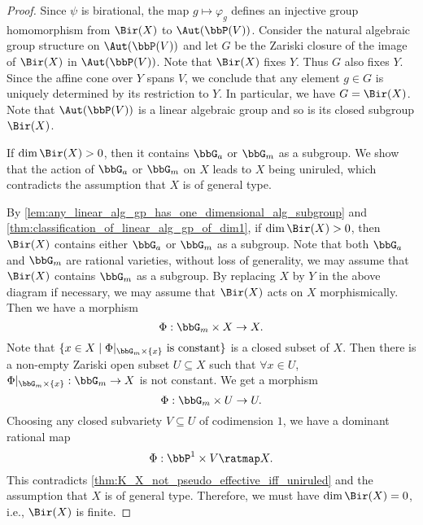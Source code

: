 \begin{proof}
        Since \(\psi\) is birational, the map \(g \mapsto \varphi_g\) defines an injective group homomorphism from \(\Bir(X)\) to \(\Aut(\bbP(V))\).
        Consider the natural algebraic group structure on \(\Aut(\bbP(V))\) and let \(G\) be the Zariski closure of the image of \(\Bir(X)\) in \(\Aut(\bbP(V))\).
        Note that \(\Bir(X)\) fixes \(Y\).
        Thus \(G\) also fixes \(Y\).
        Since the affine cone over \(Y\) spans \(V\), we conclude that any element \(g \in G\) is uniquely determined by its restriction to \(Y\).
        In particular, we have \(G = \Bir(X)\).
        Note that \(\Aut(\bbP(V))\) is a linear algebraic group and so is its closed subgroup \(\Bir(X)\).

        \begin{step}\label{step_in_thm:birational_group_of_varieties_of_general_type:Bir_X_is_finite}
            If \(\dim \Bir(X) > 0\), then it contains \(\bbG_a\) or \(\bbG_m\) as a subgroup.
            We show that the action of \(\bbG_a\) or \(\bbG_m\) on \(X\) leads to \(X\) being uniruled, which contradicts the assumption that \(X\) is of general type.
        \end{step}

        By \cref{lem:any_linear_alg_gp_has_one_dimensional_alg_subgroup} and \cref{thm:classification_of_linear_alg_gp_of_dim1}, if \(\dim \Bir(X) > 0\), then \(\Bir(X)\) contains either \(\bbG_a\) or \(\bbG_m\) as a subgroup.
        Note that both \(\bbG_a\) and \(\bbG_m\) are rational varieties, without loss of generality, we may assume that \(\Bir(X)\) contains \(\bbG_m\) as a subgroup.
        By replacing \(X\) by \(Y\) in the above diagram if necessary, we may assume that \(\Bir(X)\) acts on \(X\) morphismically.
        Then we have a morphism
        \[ \Phi: \bbG_m \times X \to X. \]
        Note that \(\{x \in X \mid \Phi|_{\bbG_m \times \{x\}} \text{ is constant}\}\) is a closed subset of \(X\).
        Then there is a non-empty Zariski open subset \(U \subseteq X\) such that \(\forall x \in U\), \(\Phi|_{\bbG_m \times \{x\}}: \bbG_m \to X\) is not constant.
        We get a morphism
        \[ \Phi: \bbG_m \times U \to U. \]
        Choosing any closed subvariety \(V \subseteq U\) of codimension \(1\), we have a dominant rational map
        \[ \Phi: \bbP^1 \times V \ratmap X. \]
        This contradicts \cref{thm:K_X_not_pseudo_effective_iff_uniruled} and the assumption that \(X\) is of general type.
        Therefore, we must have \(\dim \Bir(X) = 0\), i.e., \(\Bir(X)\) is finite.
    \end{proof}

